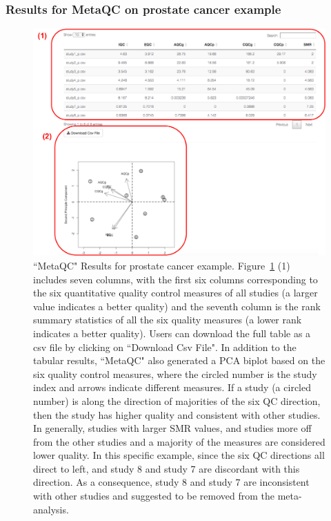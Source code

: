 \subsubsection{Results for MetaQC on prostate cancer example}




\begin{figure}[H]
\begin{center}
\includegraphics[scale=0.65]{./figure/metaQC/metaQCresult_Prostate.pdf}
\caption{``MetaQC" Results for prostate cancer example.
Figure~\ref{fig:MetaQCresult} {\color{red} (1)} includes seven columns, 
with the first six columns corresponding to the six quantitative quality control measures of all studies (a larger value indicates a better quality) and the seventh column is the rank summary statistics of all the six quality measures (a lower rank indicates a better quality). 
Users can download the full table as a csv file by clicking on ``Download Csv File". 
In addition to the tabular results, ``MetaQC" also generated a PCA biplot based on the six quality control measures, 
where the circled number is the study index and arrows indicate different measures. 
If a study (a circled number) is along the direction of majorities of the six QC direction, then the study has higher quality and consistent with other studies.
In generally, studies with larger SMR values, and studies more off from the other studies and a majority of the measures are considered lower quality.
In this specific example, since the six QC directions all direct to left, 
and study 8 and study 7 are discordant with this direction.
As a consequence, study 8 and study 7 are inconsistent with other studies and suggested to be removed from the meta-analysis.
}
\label{fig:MetaQCresult}
\end{center}
\end{figure}


